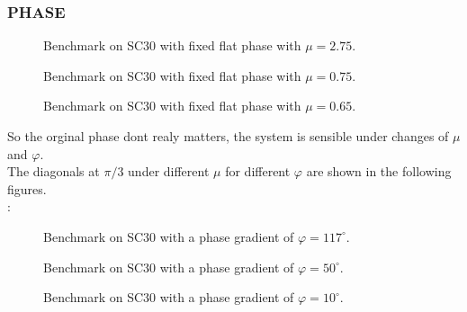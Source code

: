 \documentclass[../main.tex]{subfiles}
\begin{document}
\subsubsection{PHASE}
\begin{figure}[H]
    \centering
    
    \caption{Benchmark on SC30 with fixed flat phase with $\mu = 2.75$.}
    \label{fig:sc30_fixed_flat_phase}
\end{figure}
\begin{figure}[H]
    \centering
    
    \caption{Benchmark on SC30 with fixed flat phase with $\mu = 0.75$.}
    \label{fig:sc30_fixed_flat_phase}
\end{figure}

\begin{figure}[H]
    \centering
    
    \caption{Benchmark on SC30 with fixed flat phase with $\mu = 0.65$.}
    \label{fig:sc30_fixed_flat_phase}
\end{figure}

So the orginal phase dont realy matters, the system is sensible under changes of $\mu$ and $\varphi$.\\

The diagonals at $\pi/3$ under different $\mu$ for different $\varphi$ are shown in the following figures.\\:
\begin{figure}[H]
    \centering
    
    \caption{Benchmark on SC30 with a phase gradient of $\varphi = 117^{\circ}$.}
    \label{fig:sc30_fixed_flat_phase}
\end{figure}
\begin{figure}[H]
    \centering
    
    \caption{Benchmark on SC30 with a phase gradient of $\varphi = 50^{\circ}$.}
    \label{fig:sc30_fixed_flat_phase}
\end{figure}
\begin{figure}[H]
    \centering
    
    \caption{Benchmark on SC30 with a phase gradient of $\varphi = 10^{\circ}$.}
    \label{fig:sc30_fixed_flat_phase}
\end{figure}
\end{document}
